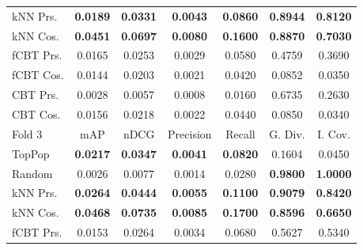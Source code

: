 \begin{table}[hbt]
\begin{tabulary}{\textwidth}{|L|CCCCCC|}
kNN Prs. & \textbf{0.0189} &  \textbf{0.0331} &  \textbf{0.0043} &  \textbf{0.0860} &                                  \textbf{0.8944} &                                   \textbf{0.8120} \\
kNN Cos. & \textbf{0.0451} &  \textbf{0.0697} &  \textbf{0.0080} &  \textbf{0.1600} &                                  \textbf{0.8870} &                                   \textbf{0.7030} \\
fCBT Prs. & 0.0165 &           0.0253 &           0.0029 &           0.0580 &                                           0.4759 &                                            0.3690 \\
fCBT Cos. & 0.0144 &           0.0203 &           0.0021 &           0.0420 &                                           0.0852 &                                            0.0350 \\
CBT Prs. & 0.0028 &           0.0057 &           0.0008 &           0.0160 &                                           0.6735 &                                            0.2630 \\
CBT Cos. & 0.0156 &           0.0218 &           0.0022 &           0.0440 &                                           0.0850 &                                            0.0340 \\
\hline
\hline
Fold 3 & mAP & nDCG & Precision & Recall & G. Div. & I. Cov. \\
\hline
TopPop & \textbf{0.0217} &  \textbf{0.0347} &  \textbf{0.0041} &  \textbf{0.0820} &                                           0.1604 &                                            0.0450 \\
Random & 0.0026 &           0.0077 &           0.0014 &           0.0280 &                                  \textbf{0.9800} &                                   \textbf{1.0000} \\
kNN Prs. & \textbf{0.0264} &  \textbf{0.0444} &  \textbf{0.0055} &  \textbf{0.1100} &                                  \textbf{0.9079} &                                   \textbf{0.8420} \\
kNN Cos. & \textbf{0.0468} &  \textbf{0.0735} &  \textbf{0.0085} &  \textbf{0.1700} &                                  \textbf{0.8596} &                                   \textbf{0.6650} \\
fCBT Prs. & 0.0153 &           0.0264 &           0.0034 &           0.0680 &                                           0.5627 &                                            0.5340 \\

\end{tabulary}
\end{table}
